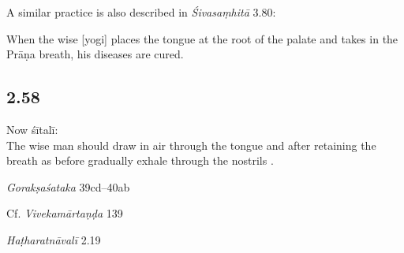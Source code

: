 \begin{ekdosis}
\begin{philcomm}[hp02_057]
A similar practice is also described in \emph{Śivasaṃhitā} 3.80:

\begin{versinnote}
When the wise [yogi] places the tongue at the root of the palate and takes in the Prāṇa breath, his diseases are cured.
\end{versinnote}
\begin{versinnote}
\end{versinnote}

\end{philcomm}

\subsection*{2.58}
\begin{translation}[hp02_058]
Now śītalī:\\
The wise man should draw in air through the tongue and after retaining the breath as before gradually exhale through the nostrils .
\end{translation}

\begin{sources}[hp02_058]
\emph{Gorakṣaśataka} 39cd–40ab

\begin{versinnote}
\end{versinnote}

Cf. \emph{Vivekamārtaṇḍa} 139
\begin{versinnote}
\end{versinnote}
\end{sources}

\begin{testimonia}[hp02_058]
\emph{Haṭharatnāvalī} 2.19
\begin{versinnote}
\end{versinnote}


\end{testimonia}
\end{ekdosis}
